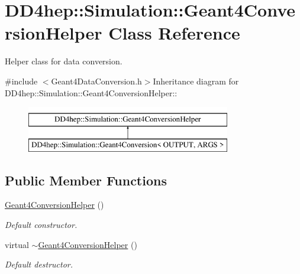 \hypertarget{class_d_d4hep_1_1_simulation_1_1_geant4_conversion_helper}{
\section{DD4hep::Simulation::Geant4ConversionHelper Class Reference}
\label{class_d_d4hep_1_1_simulation_1_1_geant4_conversion_helper}
}


Helper class for data conversion.  


{\ttfamily \#include $<$Geant4DataConversion.h$>$}Inheritance diagram for DD4hep::Simulation::Geant4ConversionHelper::\begin{figure}[H]
\begin{center}
\leavevmode
\includegraphics[height=2cm]{class_d_d4hep_1_1_simulation_1_1_geant4_conversion_helper}
\end{center}
\end{figure}
\subsection*{Public Member Functions}
\begin{DoxyCompactItemize}
\item 
\hyperlink{class_d_d4hep_1_1_simulation_1_1_geant4_conversion_helper_a58610a40f83c77313587b7eb8eddcd40}{Geant4ConversionHelper} ()
\begin{DoxyCompactList}\small\item\em Default constructor. \item\end{DoxyCompactList}\item 
virtual \hyperlink{class_d_d4hep_1_1_simulation_1_1_geant4_conversion_helper_ae69165a68948c43f52a9ef1f30b29ec0}{$\sim$Geant4ConversionHelper} ()
\begin{DoxyCompactList}\small\item\em Default destructor. \item\end{DoxyCompactList}\end{DoxyCompactItemize}
